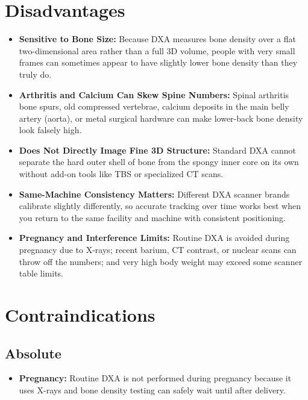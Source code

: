 \section{Disadvantages}
\begin{itemize}
\item \textbf{Sensitive to Bone Size:} Because DXA measures bone density over a flat two-dimensional area rather than a full 3D volume, people with very small frames can sometimes appear to have slightly lower bone density than they truly do.
\item \textbf{Arthritis and Calcium Can Skew Spine Numbers:} Spinal arthritis bone spurs, old compressed vertebrae, calcium deposits in the main belly artery (aorta), or metal surgical hardware can make lower-back bone density look falsely high.
\item \textbf{Does Not Directly Image Fine 3D Structure:} Standard DXA cannot separate the hard outer shell of bone from the spongy inner core on its own without add-on tools like TBS or specialized CT scans.
\item \textbf{Same-Machine Consistency Matters:} Different DXA scanner brands calibrate slightly differently, so accurate tracking over time works best when you return to the same facility and machine with consistent positioning.
\item \textbf{Pregnancy and Interference Limits:} Routine DXA is avoided during pregnancy due to X-rays; recent barium, CT contrast, or nuclear scans can throw off the numbers; and very high body weight may exceed some scanner table limits.
\end{itemize}

\section{Contraindications}

\subsection{Absolute}
\begin{itemize}
\item \textbf{Pregnancy:} Routine DXA is not performed during pregnancy because it uses X-rays and bone density testing can safely wait until after delivery.
\end{itemize}

